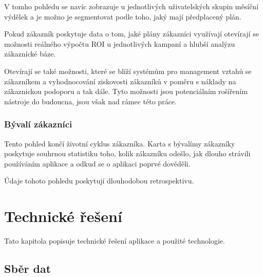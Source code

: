 \documentclass[bc,male,java,dept456]{diploma}						%
\begin{document}
V tomho pohledu se navíc zobrazuje u jednotlivých uživatelských skupin měsíční výdělek a je možno je segmentovat podle toho, jaký mají předplacený plán. 

Pokud zákazník poskytuje data o tom, jaké plány zákazníci využívají otevírají se možnosti reálného výpočtu ROI u jednotlivých kampaní a hlubší analýzu zákaznícké báze.

Otevírají se také možnosti, které se blíží systémům pro management vztahů se zá\-kaz\-ní\-kem a vyhodnocování ziskovosti zákazníků v poměru s náklady na zákaznickou podoporu a tak dále. Tyto možnosti jsou potenciálním rošířením nástroje do budoucna, jsou však nad rámec této práce.


\subsubsection{Bývalí zákazníci}

Tento pohled končí životní cyklus zákazníka. Karta s bývalímy zákazníky poskytuje souhrnou statistiku toho, kolik zákazníku odešlo, jak dlouho strávili používáním aplikace a odkud se o aplikaci poprvé dověděli.

Údaje tohoto pohledu poskytují dlouhodobou retrospektivu.

\section{Technické řešení}

Tato kapitola popisuje technické řešení aplikace a použité technologie. 



\subsection{Sběr dat}
\end{document}
